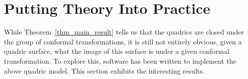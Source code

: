 \documentclass{birkjour}
\theoremstyle{definition}
\theoremstyle{remark}
\numberwithin{equation}{section}
\begin{document}
%

\section{Putting Theory Into Practice}

While Theorem~\ref{thm_main_result} tells us that the quadrics are
closed under the group of conformal transformations, it is still not
entirely obvious, given a quadric surface, what the image of this
surface is under a given conformal transformation.  To explore this,
software has been written to implement the above quadric model.
This section exhibits the interesting results.



\end{document}
